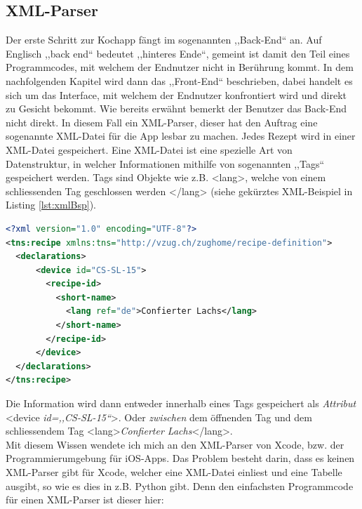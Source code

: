 \documentclass[12pt]{article}
\begin{document}
\subsection{XML-Parser}
Der erste Schritt zur Kochapp fängt im sogenannten ,,Back-End`` an. Auf Englisch ,,back end`` bedeutet ,,hinteres Ende``, gemeint ist damit den Teil eines Programmcodes, mit welchem der Endnutzer nicht in Berührung kommt. In dem nachfolgenden Kapitel wird dann das ,,Front-End`` beschrieben, dabei handelt es sich um das Interface, mit welchem der Endnutzer konfrontiert wird und direkt zu Gesicht bekommt. Wie bereits erwähnt bemerkt der Benutzer das Back-End nicht direkt. In diesem Fall ein XML-Parser, dieser hat den Auftrag eine sogenannte XML-Datei für die App lesbar zu machen. Jedes Rezept wird in einer XML-Datei gespeichert. Eine XML-Datei ist eine spezielle Art von Datenstruktur, in welcher Informationen mithilfe von sogenannten ,,Tags`` gespeichert werden. Tags sind Objekte wie z.B. \colorbox{backcolour}{<lang>}, welche von einem schliessenden Tag geschlossen werden \colorbox{backcolour}{</lang>} (siehe gekürztes XML-Beispiel in Listing \ref{lst:xmlBsp}). \cite{bray2000extensible}
\begin{lstlisting}[language=XML,caption={XML-Beispiel gekürzt, Quelle: VZUG AG},label={lst:xmlBsp}]
<?xml version="1.0" encoding="UTF-8"?>
<tns:recipe xmlns:tns="http://vzug.ch/zughome/recipe-definition">
  <declarations>
      <device id="CS-SL-15">
        <recipe-id>
          <short-name>
            <lang ref="de">Confierter Lachs</lang>
          </short-name>
        </recipe-id>
      </device>
  </declarations>
</tns:recipe>
\end{lstlisting}
Die Information wird dann entweder innerhalb eines Tags gespeichert als \textit{Attribut} \colorbox{backcolour}{<device \textit{id=,,CS-SL-15``}>}. Oder \textit{zwischen} dem öffnenden Tag und dem schliessendem Tag \colorbox{backcolour}{<lang>\textit{Confierter Lachs}</lang>}. \\ Mit diesem Wissen wendete ich mich an den XML-Parser von Xcode, bzw. der Programmierumgebung für iOS-Apps. Das Problem besteht darin, dass es keinen XML-Parser gibt für Xcode, welcher eine XML-Datei einliest und eine Tabelle ausgibt, so wie es dies in z.B. Python gibt. Denn den einfachsten Programmcode für einen XML-Parser ist dieser hier:
\end{document}
